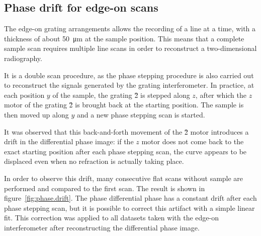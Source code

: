 \subsection{Phase drift for edge-on scans}
The edge-on grating arrangements allows the recording of a line at a time,
with a thickness of about \SI{50}{\micro\meter} at the sample position. This
means that a complete sample scan requires multiple line scans in order to
reconstruct a two-dimensional radiography.

It is a double scan procedure, as the phase stepping procedure is also
carried out to reconstruct the signals generated by the grating
interferometer. In practice, at each position $y$ of the sample, the grating
\G2 is stepped along $z$, after which the $z$ motor of the grating \G2 is
brought back at the starting position. The sample is then moved up along $y$
and a new phase stepping scan is started.

It was observed that this back-and-forth movement of the \G2 motor 
introduces a drift in the differential phase image: if the $z$ motor does
not come back to the exact starting position after each phase stepping scan,
the curve appears to be displaced even when no refraction is actually taking
place.

In order to observe this drift, many consecutive flat scans without sample are performed
and compared to the first scan. The result is shown in
figure~\ref{fig:phase.drift}. The phase differential phase has a constant
drift after each phase stepping scan, but it is possible to correct this
artifact with a simple linear fit. This correction was applied to all
datasets taken with the edge-on interferometer after reconstructing the differential
phase image.

